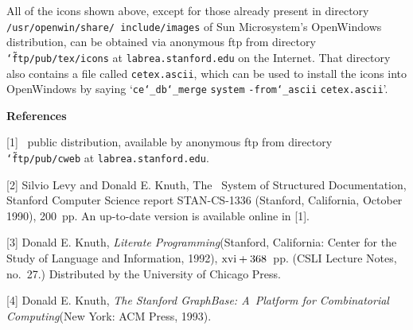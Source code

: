 All of the icons shown above, except for those already present in
directory {\tt/usr/openwin/share/\allowbreak
include/images} of Sun Microsystem's
OpenWindows distribution, can be obtained via anonymous ftp from directory
{\tt \char`\~ftp/pub/tex/icons} at {\tt labrea.stanford.edu} on the Internet.
That directory also contains a file called {\tt cetex.ascii}, which can
be used to install the icons into OpenWindows by saying
`{\tt ce\char`\_db\char`\_merge} {\tt system} {\tt -from\char`\_ascii}
{\tt cetex.ascii}'.

\bigbreak
\centerline{\bf References}
\nobreak\medskip
\item{[1]} \CWEB\ public distribution, available by anonymous ftp from
directory {\tt\char`\~ftp/pub/cweb} at {\tt labrea.stanford.edu}.
\smallskip
\item{[2]} Silvio Levy and Donald E. Knuth, The \CWEB\ System of
Structured Documentation, Stanford Computer Science report
STAN-CS-1336 (Stanford, California, October 1990),  200~pp.
An up-to-date version is available online in [1].
\smallskip
\item{[3]} Donald E. Knuth, {\sl Literate Programming\/}\break (Stanford,
 California: Center for the Study of Language and Information, 1992),
 $\rm xvi+368$~pp. (CSLI Lecture Notes, no.~27.)
 Distributed by the University of Chicago Press.
\smallskip
\item{[4]} Donald E. Knuth, {\sl The Stanford GraphBase: A~Platform
for Combinatorial Computing\/}\break (New York: ACM Press, 1993).

\bye
